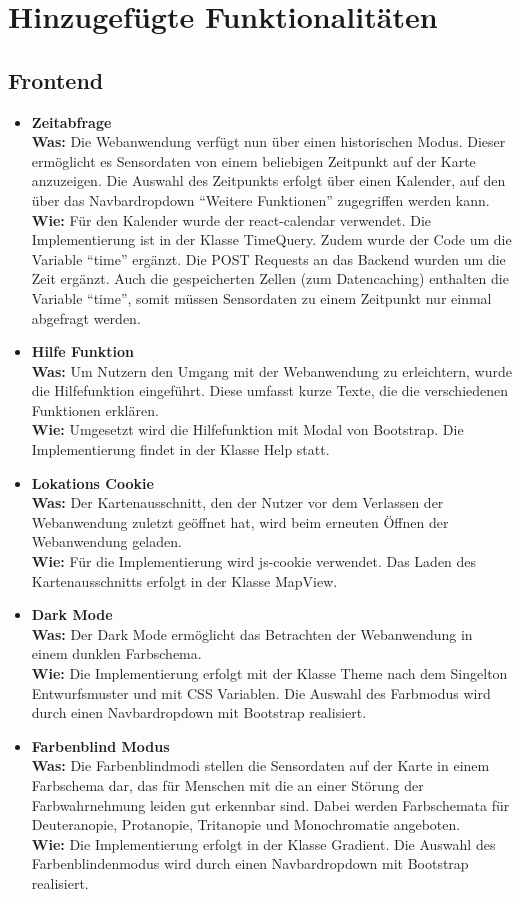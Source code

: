 \section{Hinzugefügte Funktionalitäten}

\subsection{Frontend}
\begin{itemize}
	\item \textbf{Zeitabfrage}
	\\
	\textbf{Was:} Die Webanwendung verfügt nun über einen historischen Modus. Dieser ermöglicht es Sensordaten von einem beliebigen Zeitpunkt auf der Karte anzuzeigen. Die Auswahl des Zeitpunkts erfolgt über einen Kalender, auf den über das Navbardropdown \enquote{Weitere Funktionen} zugegriffen werden kann.
	\\ 
	\textbf{Wie:} Für den Kalender wurde der react-calendar verwendet. Die Implementierung ist in der Klasse TimeQuery. Zudem wurde der Code um die Variable \enquote{time} ergänzt. Die POST Requests an das Backend wurden um die Zeit ergänzt. Auch die gespeicherten Zellen (zum Datencaching) enthalten die Variable \enquote{time}, somit müssen Sensordaten zu einem Zeitpunkt nur einmal abgefragt werden.
	\item \textbf{Hilfe Funktion}
	\\
	\textbf{Was:} Um Nutzern den Umgang mit der Webanwendung zu erleichtern, wurde die Hilfefunktion eingeführt. Diese umfasst kurze Texte, die die verschiedenen Funktionen erklären. 
	\\
	\textbf{Wie:} Umgesetzt wird die Hilfefunktion mit Modal von \gls{Bootstrap}. Die Implementierung findet in der Klasse Help statt.
	\item \textbf{Lokations Cookie}
	\\
	\textbf{Was:} Der Kartenausschnitt, den der Nutzer vor dem Verlassen der Webanwendung zuletzt geöffnet hat, wird beim erneuten Öffnen der Webanwendung geladen.
	\\
	\textbf{Wie:} Für die Implementierung wird js-cookie verwendet. Das Laden des Kartenausschnitts erfolgt in der Klasse MapView.
	\item \textbf{Dark Mode}
	\\
	\textbf{Was:} Der Dark Mode ermöglicht das Betrachten der Webanwendung in einem dunklen Farbschema.
	\\
	\textbf{Wie:} Die Implementierung erfolgt mit der Klasse Theme nach dem Singelton Entwurfsmuster und mit CSS Variablen. Die Auswahl des Farbmodus wird durch einen Navbardropdown mit \gls{Bootstrap} realisiert.
	\item \textbf{Farbenblind Modus} 
	\\
	\textbf{Was:} Die Farbenblindmodi stellen die Sensordaten auf der Karte in einem Farbschema dar, das für Menschen mit die an einer Störung der Farbwahrnehmung leiden gut erkennbar sind. Dabei werden Farbschemata für Deuteranopie, Protanopie, Tritanopie und Monochromatie angeboten.
	\\
	\textbf{Wie:} Die Implementierung erfolgt in der Klasse Gradient. Die Auswahl des Farbenblindenmodus wird durch einen Navbardropdown mit \gls{Bootstrap} realisiert.
\end{itemize}
